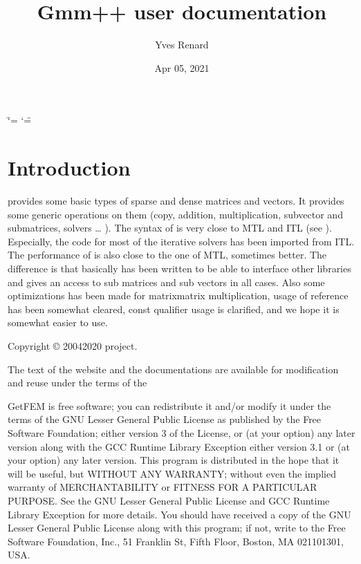\documentclass[a4paper,11pt,english]{sphinxmanual}
\title{Gmm++ user documentation}
\date{Apr 05, 2021}
\author{Yves Renard}
\begin{document}
\ifdefined\shorthandoff
  \ifnum\catcode`\=\string=\active\shorthandoff{=}\fi
  \ifnum\catcode`\"=\active{}\fi
\fi

\pagestyle{empty}
\sphinxmaketitle
\pagestyle{plain}
\sphinxtableofcontents
\pagestyle{normal}
\label{\detokenize{gmm/index::doc}}
\begin{figure}[htbp]
\centering

\noindent{}
\end{figure}




\chapter{Introduction}
\label{\detokenize{gmm/intro:introduction}}\label{\detokenize{gmm/intro:gmm-intro}}\label{\detokenize{gmm/intro::doc}}
\sphinxAtStartPar
{} provides some basic types of sparse and dense matrices and vectors. It provides some generic operations on them (copy, addition, multiplication, sub\sphinxhyphen{}vector and sub\sphinxhyphen{}matrices, solvers … ). The syntax of  is very close to MTL and ITL (see ). Especially, the code for most of the iterative solvers has been imported from ITL. The performance of  is also close to the one of MTL, sometimes better. The difference is that basically  has been written to be able to interface other libraries and gives an access to sub matrices and sub vectors in all cases. Also some optimizations has been made for matrix\sphinxhyphen{}matrix multiplication, usage of reference has been somewhat cleared, const qualifier usage is clarified, and we hope it is somewhat easier to use.

\sphinxAtStartPar
Copyright © 2004\sphinxhyphen{}2020  project.

\sphinxAtStartPar
The text of the  website and the documentations are available for modification and reuse under the terms of the 

\sphinxAtStartPar
GetFEM  is  free software;  you  can  redistribute  it  and/or modify it
under  the  terms  of the  GNU  Lesser General Public License as published
by  the  Free Software Foundation;  either version 3 of the License,  or
(at your option) any later version along with the GCC Runtime Library
Exception either version 3.1 or (at your option) any later version.
This program  is  distributed  in  the  hope  that it will be useful,  but
WITHOUT ANY WARRANTY; without even the implied warranty of MERCHANTABILITY
or  FITNESS  FOR  A PARTICULAR PURPOSE.  See the GNU Lesser General Public
License and GCC Runtime Library Exception for more details.
You  should  have received a copy of the GNU Lesser General Public License
along  with  this program;  if not, write to the Free Software Foundation,
Inc., 51 Franklin St, Fifth Floor, Boston, MA  02110\sphinxhyphen{}1301, USA.
\end{document}

